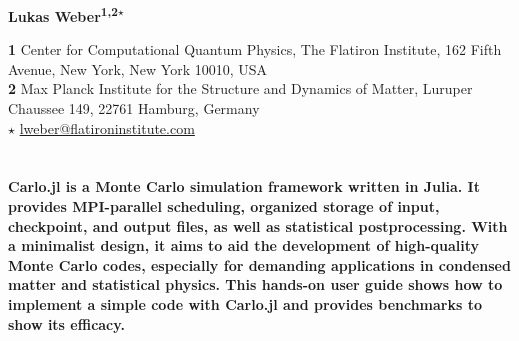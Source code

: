 \documentclass{SciPost}
\begin{document}
\pagestyle{SPstyle}

\begin{center}{\Large \textbf{\color{scipostdeepblue}{
Carlo.jl: A general framework for Monte Carlo simulations in Julia
}}}\end{center}

\begin{center}\textbf{
Lukas Weber\textsuperscript{1,2$\star$}
}\end{center}

\begin{center}
{\bf 1} Center for Computational Quantum Physics, The Flatiron Institute,
162 Fifth Avenue, New York, New York 10010, USA
\\
{\bf 2} Max Planck Institute for the Structure and Dynamics of Matter,
Luruper Chaussee 149, 22761 Hamburg, Germany
\\[\baselineskip]
$\star$ \href{mailto:lweber@flatironinstitute.com}{\small lweber@flatironinstitute.com}
\end{center}


\section*{\color{scipostdeepblue}{Abstract}}
{\boldmath\textbf{%
Carlo.jl is a Monte Carlo simulation framework written in Julia. It provides MPI-parallel scheduling, organized storage of input, checkpoint, and output files, as well as statistical postprocessing. With a minimalist design, it aims to aid the development of high-quality Monte Carlo codes, especially for demanding applications in condensed matter and statistical physics. This hands-on user guide shows how to implement a simple code with Carlo.jl and provides benchmarks to show its efficacy.
}}

\vspace{\baselineskip}

\noindent\textcolor{white!90!black}{%
}
\end{document}
